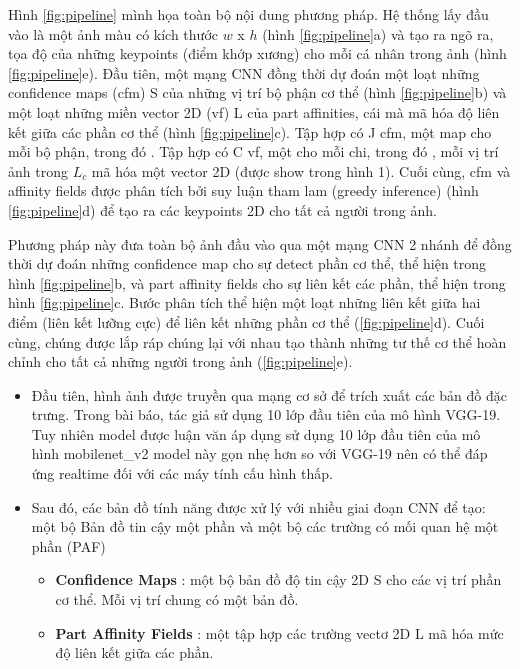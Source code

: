 Hình \ref{fig:pipeline} mình họa toàn bộ nội dung phương pháp. Hệ thống lấy đầu vào là một ảnh màu có kích thước $w$ x $h$ (hình \ref{fig:pipeline}a) và tạo ra ngõ ra, tọa độ của những keypoints (điểm khớp xương) cho mỗi cá nhân trong ảnh (hình \ref{fig:pipeline}e). Đầu tiên, một mạng CNN đồng thời dự đoán một loạt những confidence maps (cfm) S của những vị trí bộ phận cơ thể (hình \ref{fig:pipeline}b) và một loạt những miền vector 2D (vf) L của part affinities, cái mà mã hóa độ liên kết giữa các phần cơ thể (hình \ref{fig:pipeline}c). Tập hợp  có J cfm, một map cho mỗi bộ phận, trong đó . Tập hợp  có C vf, một cho mỗi chi, trong đó , mỗi vị trí ảnh trong $L_c$ mã hóa một vector 2D (được show trong hình 1). Cuối cùng, cfm và affinity fields được phân tích bởi suy luận tham lam (greedy inference) (hình \ref{fig:pipeline}d) để tạo ra các keypoints 2D cho tất cả người trong ảnh.

Phương pháp này đưa toàn bộ ảnh đầu vào qua một mạng CNN 2 nhánh để đồng thời dự đoán những confidence map cho sự detect phần cơ thể, thể hiện trong hình \ref{fig:pipeline}b, và part affinity fields cho sự liên kết các phần, thể hiện trong hình \ref{fig:pipeline}c. Bước phân tích thể hiện một loạt những liên kết giữa hai điểm (liên kết lưỡng cực) để liên kết những phần cơ thể (\ref{fig:pipeline}d). Cuối cùng, chúng được lắp ráp chúng lại với nhau tạo thành những tư thế cơ thể hoàn chỉnh cho tất cả những người trong ảnh (\ref{fig:pipeline}e).

\begin{itemize} %
\item Đầu tiên, hình ảnh được truyền qua mạng cơ sở để trích xuất các bản đồ đặc trưng. Trong bài báo, tác giả sử dụng 10 lớp đầu tiên của mô hình VGG-19. Tuy nhiên model được luận văn áp dụng sử dụng 10 lớp đầu tiên của mô hình mobilenet\_v2 model này gọn nhẹ hơn so với VGG-19 nên có thể đáp ứng realtime đối với các máy tính cấu hình thấp.
\end{itemize}


\begin{itemize} %
\item Sau đó, các bản đồ tính năng được xử lý với nhiều giai đoạn CNN để tạo: một bộ Bản đồ tin cậy một phần và một bộ các trường có mối quan hệ một phần (PAF)
	\begin{itemize}
	\item \textbf{Confidence Maps} : một bộ bản đồ độ tin cậy 2D S cho các vị trí phần cơ thể. Mỗi vị trí chung có một bản đồ.
	\item \textbf{Part Affinity Fields} : một tập hợp các trường vectơ 2D L mã hóa mức độ liên kết giữa các phần.
	\end{itemize}
\end{itemize}


